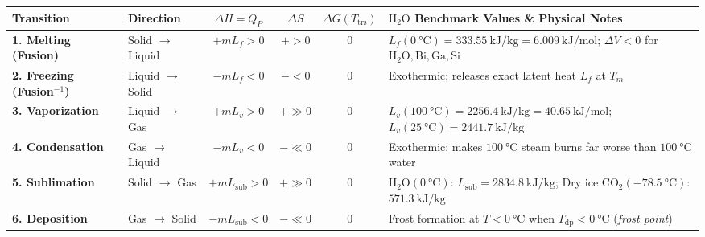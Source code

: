 \begin{center}
\label{tab:05:sixtransitions}
\footnotesize\setlength{\tabcolsep}{4pt}\renewcommand{\arraystretch}{1.14}
\begin{tabularx}{\linewidth}{@{}l l c c c X@{}}\toprule
\textbf{Transition} & \textbf{Direction} & \textbf{$\Delta H = Q_P$} & \textbf{$\Delta S$} & \textbf{$\Delta G(T_{\mathrm{trs}})$} & \textbf{$\mathrm{H_2O}$ Benchmark Values \& Physical Notes} \\\midrule
\textbf{1. Melting (Fusion)} & Solid $\to$ Liquid & $+m L_f > 0$ & $+ > 0$ & $0$ & $L_f(\SI{0}{\celsius}) = \SI{333.55}{\kilo\joule\per\kilogram} = \SI{6.009}{\kilo\joule\per\mole}$; $\Delta V < 0$ for $\mathrm{H_2O}, \mathrm{Bi}, \mathrm{Ga}, \mathrm{Si}$ \\
\textbf{2. Freezing (Fusion$^{-1}$)} & Liquid $\to$ Solid & $-m L_f < 0$ & $- < 0$ & $0$ & Exothermic; releases exact latent heat $L_f$ at $T_m$ \\
\textbf{3. Vaporization} & Liquid $\to$ Gas & $+m L_v > 0$ & $+ \gg 0$ & $0$ & $L_v(\SI{100}{\celsius}) = \SI{2256.4}{\kilo\joule\per\kilogram} = \SI{40.65}{\kilo\joule\per\mole}$; $L_v(\SI{25}{\celsius}) = \SI{2441.7}{\kilo\joule\per\kilogram}$ \\
\textbf{4. Condensation} & Gas $\to$ Liquid & $-m L_v < 0$ & $- \ll 0$ & $0$ & Exothermic; makes $\SI{100}{\celsius}$ steam burns far worse than $\SI{100}{\celsius}$ water \\
\textbf{5. Sublimation} & Solid $\to$ Gas & $+m L_{\mathrm{sub}} > 0$ & $+ \gg 0$ & $0$ & $\mathrm{H_2O}(\SI{0}{\celsius})$: $L_{\mathrm{sub}} = \SI{2834.8}{\kilo\joule\per\kilogram}$; Dry ice $\mathrm{CO_2}(-\SI{78.5}{\celsius})$: $\SI{571.3}{\kilo\joule\per\kilogram}$ \\
\textbf{6. Deposition} & Gas $\to$ Solid & $-m L_{\mathrm{sub}} < 0$ & $- \ll 0$ & $0$ & Frost formation at $T < \SI{0}{\celsius}$ when $T_{\mathrm{dp}} < \SI{0}{\celsius}$ (\emph{frost point}) \\\bottomrule
\end{tabularx}
\end{center}

